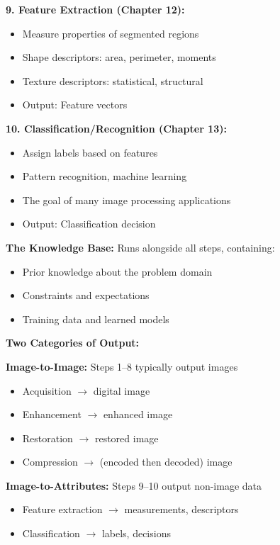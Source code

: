 \documentclass[12pt,a4paper]{article}
\begin{document}
\begin{deepexplanation}
\textbf{9. Feature Extraction (Chapter 12):}
\begin{itemize}
    \item Measure properties of segmented regions
    \item Shape descriptors: area, perimeter, moments
    \item Texture descriptors: statistical, structural
    \item Output: Feature vectors
\end{itemize}

\textbf{10. Classification/Recognition (Chapter 13):}
\begin{itemize}
    \item Assign labels based on features
    \item Pattern recognition, machine learning
    \item The goal of many image processing applications
    \item Output: Classification decision
\end{itemize}

\textbf{The Knowledge Base:}
Runs alongside all steps, containing:
\begin{itemize}
    \item Prior knowledge about the problem domain
    \item Constraints and expectations
    \item Training data and learned models
\end{itemize}
\end{deepexplanation}

\begin{mathbox}
\textbf{Two Categories of Output:}

\textbf{Image-to-Image:} Steps 1--8 typically output images
\begin{itemize}
    \item Acquisition $\rightarrow$ digital image
    \item Enhancement $\rightarrow$ enhanced image
    \item Restoration $\rightarrow$ restored image
    \item Compression $\rightarrow$ (encoded then decoded) image
\end{itemize}

\textbf{Image-to-Attributes:} Steps 9--10 output non-image data
\begin{itemize}
    \item Feature extraction $\rightarrow$ measurements, descriptors
    \item Classification $\rightarrow$ labels, decisions
\end{itemize}
\end{mathbox}
\end{document}

